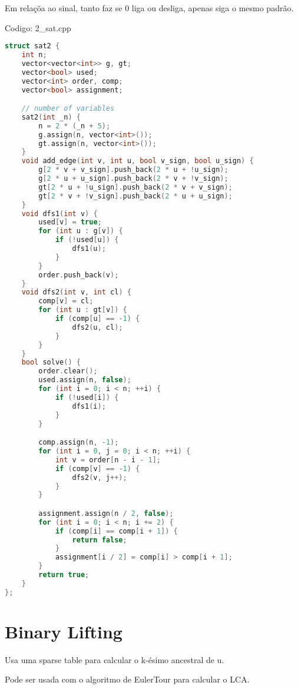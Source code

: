 \documentclass[10pt, a4paper, oneside]{book}
\begin{document}
Em relaçõa ao sinal, tanto faz se 0 liga ou desliga, apenas siga o mesmo padrão.

\hfill

Codigo: 2\_sat.cpp

\begin{lstlisting}[language=C++]
struct sat2 {
    int n;
    vector<vector<int>> g, gt;
    vector<bool> used;
    vector<int> order, comp;
    vector<bool> assignment;

    // number of variables
    sat2(int _n) {
        n = 2 * (_n + 5);
        g.assign(n, vector<int>());
        gt.assign(n, vector<int>());
    }
    void add_edge(int v, int u, bool v_sign, bool u_sign) {
        g[2 * v + v_sign].push_back(2 * u + !u_sign);
        g[2 * u + u_sign].push_back(2 * v + !v_sign);
        gt[2 * u + !u_sign].push_back(2 * v + v_sign);
        gt[2 * v + !v_sign].push_back(2 * u + u_sign);
    }
    void dfs1(int v) {
        used[v] = true;
        for (int u : g[v]) {
            if (!used[u]) {
                dfs1(u);
            }
        }
        order.push_back(v);
    }
    void dfs2(int v, int cl) {
        comp[v] = cl;
        for (int u : gt[v]) {
            if (comp[u] == -1) {
                dfs2(u, cl);
            }
        }
    }
    bool solve() {
        order.clear();
        used.assign(n, false);
        for (int i = 0; i < n; ++i) {
            if (!used[i]) {
                dfs1(i);
            }
        }

        comp.assign(n, -1);
        for (int i = 0, j = 0; i < n; ++i) {
            int v = order[n - i - 1];
            if (comp[v] == -1) {
                dfs2(v, j++);
            }
        }

        assignment.assign(n / 2, false);
        for (int i = 0; i < n; i += 2) {
            if (comp[i] == comp[i + 1]) {
                return false;
            }
            assignment[i / 2] = comp[i] > comp[i + 1];
        }
        return true;
    }
};
\end{lstlisting}
\hfill

\section{Binary Lifting}


Usa uma sparse table para calcular o k-ésimo ancestral de u.



Pode ser usada com o algoritmo de EulerTour para calcular o LCA.
\end{document}
